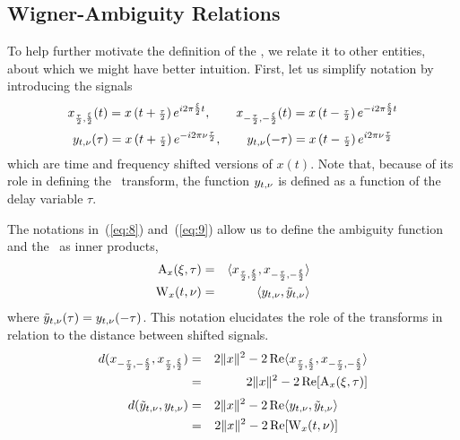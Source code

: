 \subsection{Wigner-Ambiguity Relations}\label{sec:wign-ambig-relat}
To help further motivate the definition of the \WV, we relate it
to other entities, about which we might have better intuition.  
First, let us simplify notation by introducing the signals
\begin{equation}\label{eq:8}%
\xpullpush(t) = \xtpull e^{i2\pi \halfxi t},\qquad 
\xpushpull(t) = \xtpush e^{-i2\pi \halfxi t}%
\end{equation}
\begin{equation}\label{eq:9}%
\ytnu(\tau)  = \xtpull e^{-i2\pi \nu \halftau},\qquad 
\ytnu(-\tau) = \xtpush e^{i2\pi \nu \halftau}%
\end{equation}
which are time and frequency shifted versions of 
$x(t)$. Note that, because of its role in defining the \WV\ transform,
the function $y_{t,\nu}$ is defined as a function of the delay variable
$\tau$. 

The notations in~(\ref{eq:8}) and~(\ref{eq:9}) allow us to define the
ambiguity function and the \WV\ as inner products,
\begin{eqnarray}%
\A_{x}(\xi,\tau) &=& \langle \xpullpush,\xpushpull \rangle\\
\W_{x}(t,\nu) &=& \langle \ytnu, \ytnut \rangle
\end{eqnarray}
where $\tilde{y}_{t,\nu}(\tau) = y_{t,\nu}(-\tau)$.
This notation elucidates the role of the transforms
in relation to the distance between shifted signals.
\begin{eqnarray*}
d(x_{-\frac{\tau}{2}, -\frac{\xi}{2}},x_{\frac{\tau}{2}, \frac{\xi}{2}}) &=& 
    2\|x\|^2 - 2 \,\mbox{Re}\langle x_{\frac{\tau}{2}, \frac{\xi}{2}},x_{-\frac{\tau}{2}, -\frac{\xi}{2}} \rangle\\
&=& 2\|x\|^2 - 2 \,\mbox{Re}[\operatorname{A}_{x}(\xi,\tau)]
\end{eqnarray*}
\begin{eqnarray*}
d(\tilde{y}_{t,\nu},y_{t,\nu}) &=& 
    2\|x\|^2 - 2 \,\mbox{Re}\langle y_{t,\nu},\tilde{y}_{t,\nu} \rangle\\
&=& 2\|x\|^2 - 2 \,\mbox{Re}[\operatorname{W}_{x}(t,\nu)]
\end{eqnarray*}

